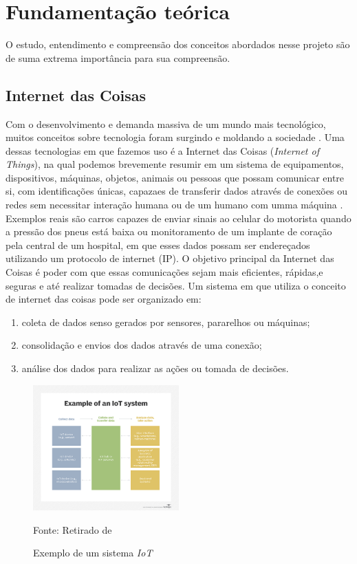 \documentclass[../../layout.tex]{subfiles}
\begin{document}
\chapter{Fundamentação teórica}
\hspace*{3em}O estudo, entendimento e compreensão dos conceitos abordados nesse projeto são de suma extrema importância para sua compreensão.

\section{Internet das Coisas}
\hspace*{3em}Com o desenvolvimento e demanda massiva de um mundo mais tecnológico, muitos conceitos sobre tecnologia foram surgindo e moldando a sociedade . Uma dessas tecnologias em que fazemos uso é a Internet das Coisas (\emph{Internet of Things}), na qual podemos brevemente resumir em um sistema de equipamentos, dispositivos, máquinas, objetos, animais ou pessoas que possam comunicar entre si, com identificações únicas, capazaes de transferir dados através de conexões ou redes sem necessitar interação humana ou de um humano com umma máquina \cite{iot}. Exemplos reais são carros capazes de enviar sinais ao celular do motorista quando a pressão dos pneus está baixa ou monitoramento de um implante de coração pela central de um hospital, em que esses dados possam ser endereçados utilizando um protocolo de internet (IP). O objetivo principal da Internet das Coisas é poder com que essas comunicações sejam mais eficientes, rápidas,e seguras e até realizar tomadas de decisões. Um sistema em que utiliza o conceito de internet das coisas pode ser organizado em:
\begin{enumerate}[label=\alph*)]
\itemsep0em
\item coleta de dados senso gerados por sensores, pararelhos ou máquinas;
\item consolidação e envios dos dados através de uma conexão;
\item análise dos dados para realizar as ações ou tomada de decisões.
\end{enumerate}

\begin{figure}[H]
\centering
\caption{Exemplo de um sistema \emph{IoT}}
\includegraphics[width=0.5\textwidth]{assets/static/img/iot_system.jpg}
\label{fig:i2c}

\begin{minipage}{0.5\textwidth}
\raggedright \footnotesize Fonte: Retirado de  
\end{minipage}
\end{figure}
\end{document}
